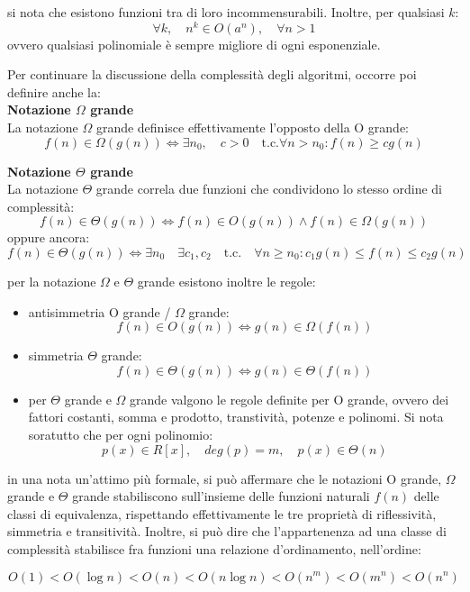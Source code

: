 \documentclass[a4paper,12pt]{article}
\begin{document}
si nota che esistono funzioni tra di loro incommensurabili. Inoltre, per qualsiasi $k$:
$$ \forall k, \quad n^k \in O(a^n), \quad \forall n > 1 $$
ovvero qualsiasi polinomiale è sempre migliore di ogni esponenziale.
\par
Per continuare la discussione della complessità degli algoritmi, occorre poi definire anche la: \\

\textbf{Notazione $\Omega$ grande} \\
La notazione $\Omega$ grande definisce effettivamente l'opposto della O grande:
$$ f(n) \in \Omega(g(n)) \Leftrightarrow \exists n_0, \quad c > 0 \quad \mathrm{t.c.} \forall n > n_0 : f(n) \geq cg(n) $$

\textbf{Notazione $\Theta$ grande} \\
La notazione $\Theta$ grande correla due funzioni che condividono lo stesso ordine di complessità:
$$ f(n) \in \Theta(g(n)) \Leftrightarrow f(n) \in O(g(n)) \land f(n) \in \Omega(g(n)) $$
oppure ancora:
$$ f(n) \in \Theta(g(n)) \Leftrightarrow \exists n_0 \quad \exists c_1,c_2 \quad \mathrm{t.c.} \quad \forall n \geq n_0 :
c_1g(n) \leq f(n) \leq c_2g(n) $$

per la notazione $\Omega$ e $\Theta$ grande esistono inoltre le regole:

\begin{itemize}
  \item antisimmetria O grande / $\Omega$ grande:
    $$ f(n) \in O(g(n)) \Leftrightarrow g(n) \in \Omega(f(n)) $$
  \item simmetria $\Theta$ grande:
    $$ f(n) \in \Theta(g(n)) \Leftrightarrow g(n) \in \Theta(f(n)) $$
  \item per $\Theta$ grande e $\Omega$ grande valgono le regole definite per O grande, ovvero dei
    fattori costanti, somma e prodotto, transtività, potenze e polinomi.
    Si nota soratutto che per ogni polinomio: $$ p(x) \in R[x], \quad deg(p) = m, \quad p(x) \in \Theta(n) $$
\end{itemize}

in una nota un'attimo più formale, si può affermare che le notazioni O grande, $\Omega$ grande e $\Theta$ grande
stabiliscono sull'insieme delle funzioni naturali $f(n)$ delle classi di equivalenza, rispettando effettivamente
le tre proprietà di riflessività, simmetria e transitività. Inoltre, si può dire che l'appartenenza ad una classe
di complessità stabilisce fra funzioni una relazione d'ordinamento, nell'ordine:

$$ O(1) < O(\log{n}) < O(n) < O(n\log{n}) < O(n^m) < O(m^n) < O(n^n) $$
\end{document}
